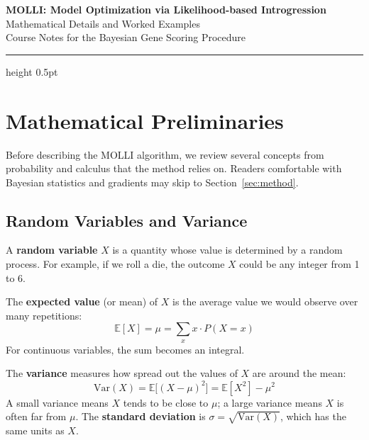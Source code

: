 \documentclass[11pt,letterpaper]{article}
\theoremstyle{definition}
\begin{document}
\begin{center}
{\LARGE\bfseries\color{navy} MOLLI: Model Optimization via Likelihood-based Introgression}\\[8pt]
{\large\color{steel} Mathematical Details and Worked Examples}\\[4pt]
{\normalsize Course Notes for the Bayesian Gene Scoring Procedure}
\end{center}
\vspace{4pt}
{\color{navy}\hrule height 0.5pt}
\vspace{12pt}

\tableofcontents
\vspace{12pt}

\section{Mathematical Preliminaries}

Before describing the MOLLI algorithm, we review several concepts from probability and calculus that the method relies on. Readers comfortable with Bayesian statistics and gradients may skip to Section~\ref{sec:method}.

\subsection{Random Variables and Variance}

A \textbf{random variable} $X$ is a quantity whose value is determined by a random process. For example, if we roll a die, the outcome $X$ could be any integer from 1 to 6.

The \textbf{expected value} (or mean) of $X$ is the average value we would observe over many repetitions:
\[
\mathbb{E}[X] = \mu = \sum_x x \cdot P(X = x)
\]
For continuous variables, the sum becomes an integral.

The \textbf{variance} measures how spread out the values of $X$ are around the mean:
\[
\text{Var}(X) = \mathbb{E}\bigl[(X - \mu)^2\bigr] = \mathbb{E}[X^2] - \mu^2
\]
A small variance means $X$ tends to be close to $\mu$; a large variance means $X$ is often far from $\mu$. The \textbf{standard deviation} is $\sigma = \sqrt{\text{Var}(X)}$, which has the same units as $X$.
\end{document}
